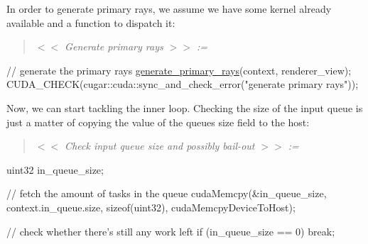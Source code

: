 \begin{DoxyParagraph}{}
In order to generate primary rays, we assume we have some kernel already available and a function to dispatch it\+: ~\newline
\label{_hello_renderer_page_Generate_primary_rays_anchor}%
%
 \begin{quote}
{\itshape  $<$$<$ Generate primary rays $>$$>$ \+:= }

\end{quote}

\begin{DoxyCode}
\textcolor{comment}{// generate the primary rays}
\hyperlink{group___p_t_lib_ga66602a846711dc021ed0b930846ea596}{generate\_primary\_rays}(context, renderer\_view);
CUDA\_CHECK(cugar::cuda::sync\_and\_check\_error(\textcolor{stringliteral}{"generate primary rays"}));
\end{DoxyCode}

\end{DoxyParagraph}
\begin{DoxyParagraph}{}
Now, we can start tackling the inner loop. Checking the size of the input queue is just a matter of copying the value of the queue\textquotesingle{}s size field to the host\+: ~\newline
\label{_hello_renderer_page_Check_input_queue_size_and_possibly_bail-out_anchor}%
%
 \begin{quote}
{\itshape  $<$$<$ Check input queue size and possibly bail-\/out $>$$>$ \+:= }

\end{quote}

\begin{DoxyCode}
uint32 in\_queue\_size;

\textcolor{comment}{// fetch the amount of tasks in the queue}
cudaMemcpy(&in\_queue\_size, context.in\_queue.size, \textcolor{keyword}{sizeof}(uint32), cudaMemcpyDeviceToHost);

\textcolor{comment}{// check whether there's still any work left}
\textcolor{keywordflow}{if} (in\_queue\_size == 0)
    \textcolor{keywordflow}{break};
\end{DoxyCode}

\end{DoxyParagraph}
